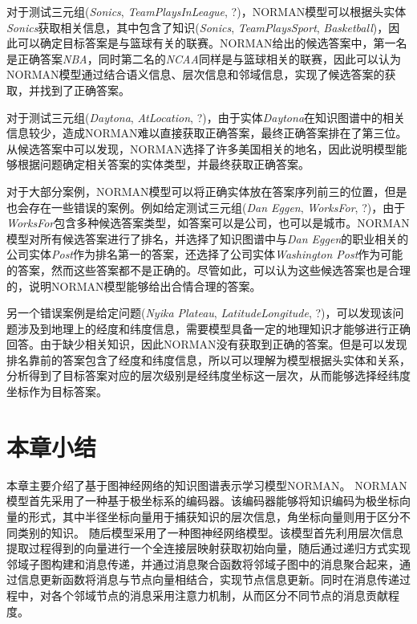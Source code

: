 \documentclass[algorithmlist, AutoFakeBold, AutoFakeSlant, figurelist, tablelist, nomlist, engineering, openany]{seuthesix} %
\begin{document}
对于测试三元组(\textit{Sonics}, \textit{TeamPlaysInLeague}, ?)，NORMAN模型可以根据头实体\textit{Sonics}获取相关信息，其中包含了知识(\textit{Sonics}, \textit{TeamPlaysSport}, \textit{Basketball})，因此可以确定目标答案是与篮球有关的联赛。NORMAN给出的候选答案中，第一名是正确答案\textit{NBA}，同时第二名的\textit{NCAA}同样是与篮球相关的联赛，因此可以认为NORMAN模型通过结合语义信息、层次信息和邻域信息，实现了候选答案的获取，并找到了正确答案。

对于测试三元组(\textit{Daytona}, \textit{AtLocation}, ?)，由于实体\textit{Daytona}在知识图谱中的相关信息较少，造成NORMAN难以直接获取正确答案，最终正确答案排在了第三位。从候选答案中可以发现，NORMAN选择了许多美国相关的地名，因此说明模型能够根据问题确定相关答案的实体类型，并最终获取正确答案。

对于大部分案例，NORMAN模型可以将正确实体放在答案序列前三的位置，但是也会存在一些错误的案例。例如给定测试三元组(\textit{Dan Eggen}, \textit{WorksFor}, ?)，由于\textit{WorksFor}包含多种候选答案类型，如答案可以是公司，也可以是城市。NORMAN模型对所有候选答案进行了排名，并选择了知识图谱中与\textit{Dan Eggen}的职业相关的公司实体\textit{Post}作为排名第一的答案，还选择了公司实体\textit{Washington Post}作为可能的答案，然而这些答案都不是正确的。尽管如此，可以认为这些候选答案也是合理的，说明NORMAN模型能够给出合情合理的答案。

另一个错误案例是给定问题(\textit{Nyika Plateau}, \textit{LatitudeLongitude}, ?)，可以发现该问题涉及到地理上的经度和纬度信息，需要模型具备一定的地理知识才能够进行正确回答。由于缺少相关知识，因此NORMAN没有获取到正确的答案。但是可以发现排名靠前的答案包含了经度和纬度信息，所以可以理解为模型根据头实体和关系，分析得到了目标答案对应的层次级别是经纬度坐标这一层次，从而能够选择经纬度坐标作为目标答案。


\section{本章小结}
本章主要介绍了基于图神经网络的知识图谱表示学习模型NORMAN。
NORMAN模型首先采用了一种基于极坐标系的编码器。该编码器能够将知识编码为极坐标向量的形式，其中半径坐标向量用于捕获知识的层次信息，角坐标向量则用于区分不同类别的知识。
随后模型采用了一种图神经网络模型。该模型首先利用层次信息提取过程得到的向量进行一个全连接层映射获取初始向量，随后通过递归方式实现邻域子图构建和消息传递，并通过消息聚合函数将邻域子图中的消息聚合起来，通过信息更新函数将消息与节点向量相结合，实现节点信息更新。同时在消息传递过程中，对各个邻域节点的消息采用注意力机制，从而区分不同节点的消息贡献程度。
\end{document}
